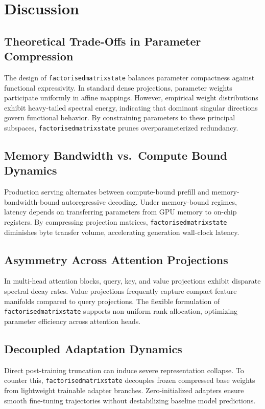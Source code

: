 \section{Discussion}

\subsection{Theoretical Trade-Offs in Parameter Compression}
The design of \texttt{factorisedmatrixstate} balances parameter compactness against functional expressivity. In standard dense projections, parameter weights participate uniformly in affine mappings. However, empirical weight distributions exhibit heavy-tailed spectral energy, indicating that dominant singular directions govern functional behavior. By constraining parameters to these principal subspaces, \texttt{factorisedmatrixstate} prunes overparameterized redundancy.

\subsection{Memory Bandwidth vs.\ Compute Bound Dynamics}
Production serving alternates between compute-bound prefill and memory-bandwidth-bound autoregressive decoding. Under memory-bound regimes, latency depends on transferring parameters from GPU memory to on-chip registers. By compressing projection matrices, \texttt{factorisedmatrixstate} diminishes byte transfer volume, accelerating generation wall-clock latency.

\subsection{Asymmetry Across Attention Projections}
In multi-head attention blocks, query, key, and value projections exhibit disparate spectral decay rates. Value projections frequently capture compact feature manifolds compared to query projections. The flexible formulation of \texttt{factorisedmatrixstate} supports non-uniform rank allocation, optimizing parameter efficiency across attention heads.

\subsection{Decoupled Adaptation Dynamics}
Direct post-training truncation can induce severe representation collapse. To counter this, \texttt{factorisedmatrixstate} decouples frozen compressed base weights from lightweight trainable adapter branches. Zero-initialized adapters ensure smooth fine-tuning trajectories without destabilizing baseline model predictions.

